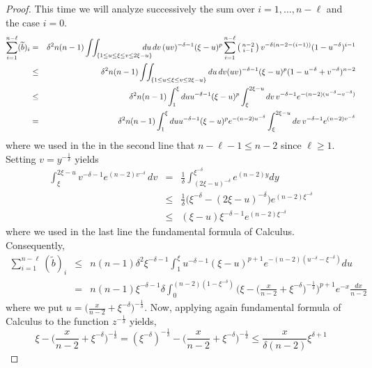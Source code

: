 \begin{proof}
This time we will analyze  successively the sum over $i=1,\ldots,n-\ell$ and the case $i=0$.
\begin{eqnarray*}
\sum_{i=1}^{n-\ell} (\widetilde b)_i&=& \delta^2 n(n-1)
\int\!\!\int_{\{1\le u\le \xi\le v\le 2\xi-u\}}\hskip -0.5 cm du\,dv\,
(uv)^{-\delta-1}(\xi-u)^p \sum_{i=1}^{n-\ell} \left(\begin{smallmatrix} n-2\\ i-1
\end{smallmatrix}\right)v^{-\delta(n-2-(i-1))} (1-u^{-\delta})^{i-1}
\\
&\le& \delta^2 n(n-1) \int\!\!\int_{\{1\le u\le \xi\le v\le
2\xi-u\}}du\,dv(uv)^{-\delta-1}(\xi-u)^p(1-u^{-\delta} +v^{-\delta})^{n-2}\\
&\le &  \delta^2 n(n-1) \int_1^{\xi} du u^{-\delta-1}(\xi-u) ^p  \int_{ 
\xi}^{2\xi-u} dv\, v^{-\delta-1}e^{-(n-2)(u^{-\delta}-v^{-\delta})}\\
&=&  \delta^2 n(n-1) \int_1^{\xi} du u^{-\delta-1}(\xi-u) ^p
e^{-(n-2)u^{-\delta}} \int_{  \xi}^{2\xi-u} dv\, v^{-\delta-1}e^{(n-2)v^{-\delta}}
\end{eqnarray*}
where we used in the  in the second line that $n-\ell-1\le n-2$ since $\ell\ge 1$. Setting $v= y^{-\frac{1}{\delta}}$ yields
\begin{eqnarray*}
 \int_{  \xi}^{2\xi-u}  v^{-\delta-1}e^{(n-2)v^{-\delta}}\, dv&=& \frac{1}{\delta} \int_{(2\xi-u)^{-\delta}}^{\xi^{-\delta}}e^{(n-2)y}dy\\
 &\le& \frac{1}{\delta} \big(\xi^{-\delta} -(2\xi-u)^{-\delta}\big)e^{(n-2)\xi^{-\delta}}\\
 &\le& (\xi-u) \xi^{-\delta-1}e^{(n-2)\xi^{-\delta}}
\end{eqnarray*}
where we used in the last line  the fundamental formula of Calculus. Consequently, 
\begin{eqnarray*}
\sum_{i=1}^{n-\ell} (\widetilde b)_i&\le&  n(n-1) \delta^2 \xi^{-\delta-1}\int_1^{\xi} u^{-\delta-1} (\xi-u)^{p+1} e^{-(n-2)(u^{-\delta}-\xi^{-\delta})}du\\
&=& n(n-1) \xi^{-\delta-1} \delta \int_0^{(n-2)(1-\xi^{-\delta})}  \Big(\xi-\big(\frac{x}{n-2}+\xi^{-\delta}\big)^{-\frac {1}{\delta}}\Big)^{p+1} e^{-x}\frac{dx}{n-2}
\end{eqnarray*}
where we   put $u=\big(\frac{x}{n-2}+\xi^{-\delta}\big)^{-\frac{1}{\delta}}$.
Now, applying again fundamental formula of Calculus to the function
$z^{-\frac{1}{\delta}}$ yields,
\[
\xi-\Big(\frac{x}{n-2}+\xi^{-\delta}\Big)^{-\frac {1}{\delta}} = (\xi^{-\delta})^{-\frac{1}{\delta}}-\Big(\frac{x}{n-2}+\xi^{-\delta}\Big)^{-\frac {1}{\delta}}\le \frac{x}{\delta(n-2)}\xi^{\delta+1}
\]
\end{proof}
